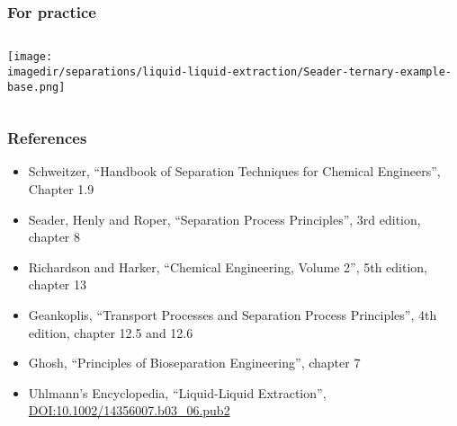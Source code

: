 \begin{frame}\frametitle{For practice}
	\begin{columns}[t]
			\begin{center}
				\texttt{[image: \\imagedir/separations/liquid-liquid-extraction/Seader-ternary-example-base.png]}
			\end{center}			
	\end{columns}
\end{frame}

\begin{frame}\frametitle{References}
	\begin{itemize}
		\item	Schweitzer, ``Handbook of Separation Techniques for Chemical Engineers'', Chapter 1.9
		\item	Seader, Henly and Roper, ``Separation Process Principles'', 3rd edition, chapter 8
		\item	Richardson and Harker, ``Chemical Engineering, Volume 2'', 5th edition, chapter 13
		\item	Geankoplis, ``Transport Processes and Separation Process Principles'', 4th edition, chapter 12.5 and 12.6
		\item	Ghosh, ``Principles of Bioseparation Engineering'', chapter 7
		\item	Uhlmann's Encyclopedia, ``Liquid-Liquid Extraction'',  \href{http://dx.doi.org/10.1002/14356007.b03\_06.pub2}{DOI:10.1002/14356007.b03\_06.pub2}
	\end{itemize}
\end{frame}


